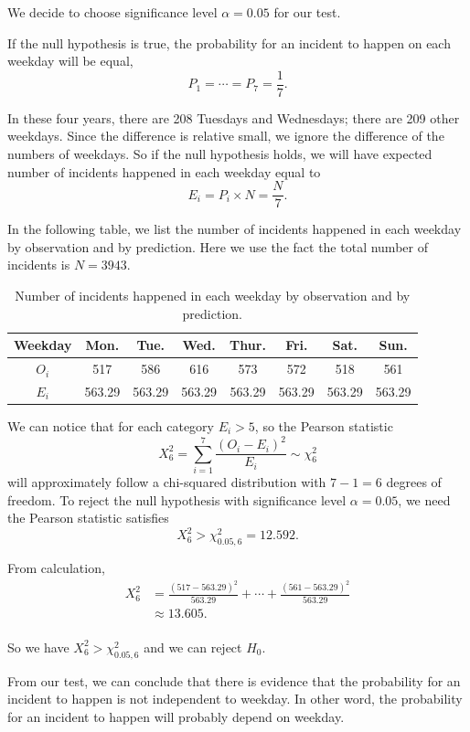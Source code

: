 \documentclass[11pt,a4paper,english]{article}
\begin{document}
We decide to choose significance level $\alpha = 0.05$ for our test.

If the null hypothesis is true, the probability for an incident to happen on each weekday will be equal, 
\[P_{1} = \cdots = P_{7} = \frac{1}{7}.\]

In these four years, there are 208  Tuesdays and Wednesdays; there are 209 other weekdays. 
Since the difference is relative small, we ignore the difference of the numbers of weekdays.
So if the null hypothesis holds, we will have expected number of incidents happened in each weekday equal to 
\[E_{i} = P_{i} \times N = \frac{N}{7}.\]

In the following table, we list the number of incidents happened in each weekday by observation and by prediction. 
Here we use the fact the total number of incidents is $N = 3943$.
\begin{table}[htbp]
	\centering
	\caption{Number of incidents happened in each weekday by observation and by prediction.}
	\begin{tabular}{c|ccccccc}
		\hline
		Weekday & Mon. & Tue. & Wed. & Thur. & Fri. & Sat. & Sun.\\
		\hline
		$O_{i}$ & 517 & 586 & 616 & 573 & 572 & 518 & 561\\
		\hline
		$E_{i}$ & 563.29 & 563.29 & 563.29 & 563.29 & 563.29 & 563.29 & 563.29\\
		\hline
	\end{tabular}
\end{table}

We can notice that for each category $E_{i} > 5$, so the Pearson statistic 
\[X^{2}_{6} = \sum_{i = 1}^{7}\frac{(O_{i}-E_{i})^{2}}{E_{i}} \sim \chi^{2}_{6}\]
will approximately follow a chi-squared distribution with $7-1 = 6$ degrees of freedom. 
To reject the null hypothesis with significance level $\alpha = 0.05$, we need the Pearson statistic satisfies
\[X^{2}_{6} > \chi^{2}_{0.05,6} = 12.592.\]

From calculation, 
\[
	\begin{aligned}
		X^{2}_{6} &= \frac{(517-563.29)^{2}}{563.29}+\cdots+\frac{(561-563.29)^{2}}{563.29}\\
		&\approx 13.605.\\
	\end{aligned}
\]

So we have $X^{2}_{6} > \chi^{2}_{0.05,6}$ and we can reject $H_{0}$.

From our test, we can conclude that there is evidence that the probability for an incident to happen is not independent to weekday. In other word, the probability for an incident to happen will probably depend on weekday.
\end{document}
